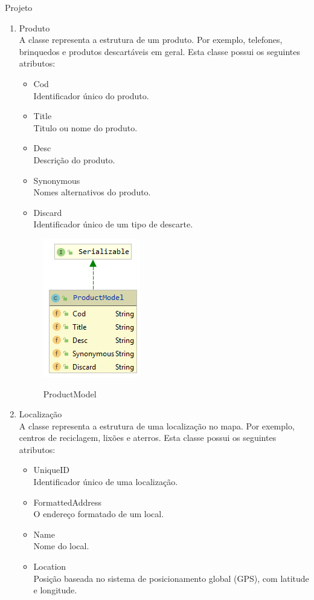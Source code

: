 \documentclass[
	12pt,				%
	openany,			%
	twoside,			%
	a4paper,			%
	english,			%
	french,				%
	spanish,			%
	brazil				%
	]{abntex2}
\begin{document}
\begin{chapter}{Projeto}
\begin{enumerate}
  \item{Produto} \\ A classe \textit{} representa a estrutura de um produto. Por exemplo, telefones, brinquedos e produtos descartáveis em geral. Esta classe possui os seguintes atributos:
  
     \begin{itemize}
  \item{Cod}\\ Identificador único do produto.
     \item{Title}\\ Titulo ou nome do produto.
       \item{Desc}\\ Descrição do produto.
         \item{Synonymous}\\ Nomes alternativos do produto.
                  \item{Discard}\\ Identificador único de um tipo de descarte.
\end{itemize}
  
\begin{figure}[h]
\centering
   \caption{ProductModel}
   \includegraphics[scale=1.0]{media/ProductModel.png}
     \label{fig:productModel}
\end{figure}

\newpage

  \item{Localização}  \\ A classe \textit{} representa a estrutura de uma localização no mapa. Por exemplo, centros de reciclagem, lixões e aterros. Esta classe possui os seguintes atributos:
  
       \begin{itemize}
  \item{UniqueID}\\ Identificador único de uma localização.
     \item{FormattedAddress}\\ O endereço formatado de um local.
       \item{Name}\\ Nome do local.
         \item{Location}\\ Posição baseada no sistema de posicionamento global (GPS), com latitude e longitude.
\end{itemize}
  

\end{enumerate}
\end{chapter}
\end{document}
